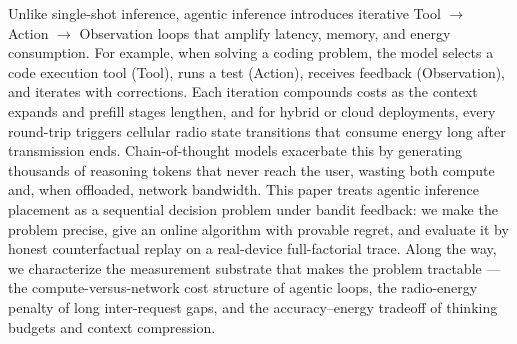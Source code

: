 \documentclass[sigconf,anonymous,review]{acmart}
\begin{document}
Unlike single-shot inference, agentic inference introduces iterative Tool $\rightarrow$ Action $\rightarrow$ Observation loops that amplify latency, memory, and energy consumption.
For example, when solving a coding problem, the model selects a code execution tool (Tool), runs a test (Action), receives feedback (Observation), and iterates with corrections.
Each iteration compounds costs as the context expands and prefill stages lengthen, and for hybrid or cloud deployments, every round-trip triggers cellular radio state transitions that consume energy long after transmission ends.
Chain-of-thought models exacerbate this by generating thousands of reasoning tokens that never reach the user, wasting both compute and, when offloaded, network bandwidth.
This paper treats agentic inference placement as a sequential decision problem under bandit feedback: we make the problem precise, give an online algorithm with provable regret, and evaluate it by honest counterfactual replay on a real-device full-factorial trace.
Along the way, we characterize the measurement substrate that makes the problem tractable --- the compute-versus-network cost structure of agentic loops, the radio-energy penalty of long inter-request gaps, and the accuracy--energy tradeoff of thinking budgets and context compression.
\end{document}
